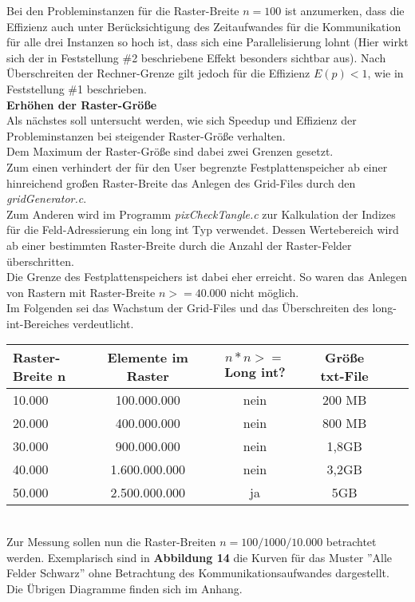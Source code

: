 \documentclass[
10pt, %
a4paper, %
oneside, %
headinclude,footinclude, %
BCOR5mm, %
]{scrartcl}
\begin{document}
Bei den Probleminstanzen für die Raster-Breite \(n=100\) ist anzumerken, dass die Effizienz auch unter Berücksichtigung des Zeitaufwandes für die Kommunikation für alle drei Instanzen so hoch ist, dass sich eine Parallelisierung lohnt (Hier wirkt sich der in Feststellung \#2 beschriebene Effekt besonders sichtbar aus). Nach Überschreiten der Rechner-Grenze gilt jedoch für die Effizienz \(E(p)<1\), wie in Feststellung \#1 beschrieben.\\

\textbf{Erhöhen der Raster-Größe}\\
Als nächstes soll untersucht werden, wie sich Speedup und Effizienz der Probleminstanzen bei steigender Raster-Größe verhalten. \\
Dem Maximum der Raster-Größe sind dabei zwei Grenzen gesetzt.\\
Zum einen verhindert der für den User begrenzte Festplattenspeicher ab einer hinreichend großen Raster-Breite das Anlegen des Grid-Files durch den \textit{gridGenerator.c}.\\
Zum Anderen wird im Programm \textit{pixCheckTangle.c} zur Kalkulation der Indizes für die Feld-Adressierung ein long int Typ verwendet. Dessen Wertebereich wird ab einer bestimmten Raster-Breite durch die Anzahl der Raster-Felder überschritten.\\
Die Grenze des Festplattenspeichers ist dabei eher erreicht. So waren das Anlegen von Rastern mit Raster-Breite \(n>=40.000\) nicht möglich.\\

Im Folgenden sei das Wachstum der Grid-Files und das Überschreiten des long-int-Bereiches verdeutlicht.\\


\begin{tabular}{l|c|c|c|c|c|}
	\hline 
	Raster-Breite n& Elemente im Raster & \(n*n>=\)Long int? & Größe txt-File \\ 
	\hline 
	10.000 & 100.000.000 & nein & 200 MB\\
	\hline 
	20.000 & 400.000.000 & nein & 800 MB \\
	\hline
	30.000 & 900.000.000 & nein &  1,8GB \\
	\hline  
	40.000 & 1.600.000.000 & nein & 3,2GB \\
	\hline
	50.000 & 2.500.000.000 & ja & 5GB \\
	\hline  
\end{tabular}\\

Zur Messung sollen nun die Raster-Breiten \(n=100/1000/10.000\) betrachtet werden. Exemplarisch sind in \textbf{Abbildung 14 } die Kurven für das Muster ''Alle Felder Schwarz'' ohne Betrachtung des Kommunikationsaufwandes dargestellt. Die Übrigen Diagramme finden sich im Anhang.\\
 
\end{document}
